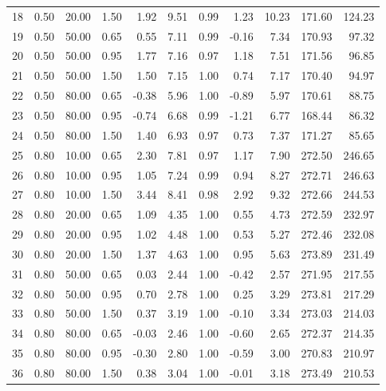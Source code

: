 \documentclass[useAMS, usenatbib, referee]{biom}\usepackage[]{graphicx}\usepackage[]{color}
\begin{document}
\begin{table}[ht]
{\begin{tabular}{rrrrrrrrrrr}
  18 & 0.50 & 20.00 & 1.50 & 1.92 & 9.51 & 0.99 & 1.23 & 10.23 & 171.60 & 124.23 \\ 
  19 & 0.50 & 50.00 & 0.65 & 0.55 & 7.11 & 0.99 & -0.16 & 7.34 & 170.93 & 97.32 \\ 
  20 & 0.50 & 50.00 & 0.95 & 1.77 & 7.16 & 0.97 & 1.18 & 7.51 & 171.56 & 96.85 \\ 
  21 & 0.50 & 50.00 & 1.50 & 1.50 & 7.15 & 1.00 & 0.74 & 7.17 & 170.40 & 94.97 \\ 
  22 & 0.50 & 80.00 & 0.65 & -0.38 & 5.96 & 1.00 & -0.89 & 5.97 & 170.61 & 88.75 \\ 
  23 & 0.50 & 80.00 & 0.95 & -0.74 & 6.68 & 0.99 & -1.21 & 6.77 & 168.44 & 86.32 \\ 
  24 & 0.50 & 80.00 & 1.50 & 1.40 & 6.93 & 0.97 & 0.73 & 7.37 & 171.27 & 85.65 \\ 
  25 & 0.80 & 10.00 & 0.65 & 2.30 & 7.81 & 0.97 & 1.17 & 7.90 & 272.50 & 246.65 \\ 
  26 & 0.80 & 10.00 & 0.95 & 1.05 & 7.24 & 0.99 & 0.94 & 8.27 & 272.71 & 246.63 \\ 
  27 & 0.80 & 10.00 & 1.50 & 3.44 & 8.41 & 0.98 & 2.92 & 9.32 & 272.66 & 244.53 \\ 
  28 & 0.80 & 20.00 & 0.65 & 1.09 & 4.35 & 1.00 & 0.55 & 4.73 & 272.59 & 232.97 \\ 
  29 & 0.80 & 20.00 & 0.95 & 1.02 & 4.48 & 1.00 & 0.53 & 5.27 & 272.46 & 232.08 \\ 
  30 & 0.80 & 20.00 & 1.50 & 1.37 & 4.63 & 1.00 & 0.95 & 5.63 & 273.89 & 231.49 \\ 
  31 & 0.80 & 50.00 & 0.65 & 0.03 & 2.44 & 1.00 & -0.42 & 2.57 & 271.95 & 217.55 \\ 
  32 & 0.80 & 50.00 & 0.95 & 0.70 & 2.78 & 1.00 & 0.25 & 3.29 & 273.81 & 217.29 \\ 
  33 & 0.80 & 50.00 & 1.50 & 0.37 & 3.19 & 1.00 & -0.10 & 3.34 & 273.03 & 214.03 \\ 
  34 & 0.80 & 80.00 & 0.65 & -0.03 & 2.46 & 1.00 & -0.60 & 2.65 & 272.37 & 214.35 \\ 
  35 & 0.80 & 80.00 & 0.95 & -0.30 & 2.80 & 1.00 & -0.59 & 3.00 & 270.83 & 210.97 \\ 
  36 & 0.80 & 80.00 & 1.50 & 0.38 & 3.04 & 1.00 & -0.01 & 3.18 & 273.49 & 210.53 \\ 
   \hline
\end{tabular}
}
\endgroup
\end{table}
\end{document}
